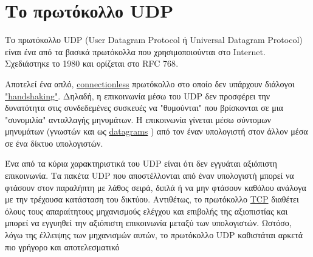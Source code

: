 \section{Το πρωτόκολλο UDP}
Το πρωτόκολλο UDP (User Datagram Protocol ή Universal Datagram Protocol)
είναι ένα από τα βασικά πρωτόκολλα που χρησιμοποιούνται στο Internet.
Σχεδιάστηκε το 1980 και ορίζεται στο RFC 768\cite{rfc768}\cite{wiki:udp}.

Αποτελεί ένα απλό,
\href{https://en.wikipedia.org/wiki/Connectionless_communication}{connectionless}
πρωτόκολλο στο οποίο δεν υπάρχουν διάλογοι
\href{https://en.wikipedia.org/wiki/Handshaking}{"handshaking"}.
Δηλαδή, η επικοινωνία μέσω του UDP δεν προσφέρει την δυνατότητα στις συνδεδεμένες συσκευές να "θυμούνται" που βρίσκονται σε μια "συνομιλία" ανταλλαγής μηνυμάτων.
Η επικοινωνία γίνεται μέσω σύντομων μηνυμάτων (γνωστών και ως
\href{https://en.wikipedia.org/wiki/Datagram}{datagrams}
) από τον έναν υπολογιστή στον άλλον μέσα σε ένα δίκτυο υπολογιστών.

Ένα από τα κύρια χαρακτηριστικά του UDP είναι ότι δεν εγγυάται αξιόπιστη επικοινωνία.
Τα πακέτα UDP που αποστέλλονται από έναν υπολογιστή μπορεί να φτάσουν στον παραλήπτη με λάθος σειρά, διπλά ή να μην φτάσουν καθόλου ανάλογα με την τρέχουσα κατάσταση του δικτύου.
Αντιθέτως, το πρωτόκολλο
\href{https://en.wikipedia.org/wiki/Transmission_Control_Protocol}{TCP}
διαθέτει όλους τους απαραίτητους μηχανισμούς ελέγχου και επιβολής της αξιοπιστίας και μπορεί να εγγυηθεί την αξιόπιστη επικοινωνία μεταξύ των υπολογιστών.
Ωστόσο, λόγω της έλλειψης των μηχανισμών αυτών, το πρωτόκολλο UDP καθιστάται αρκετά πιο γρήγορο και αποτελεσματικό

